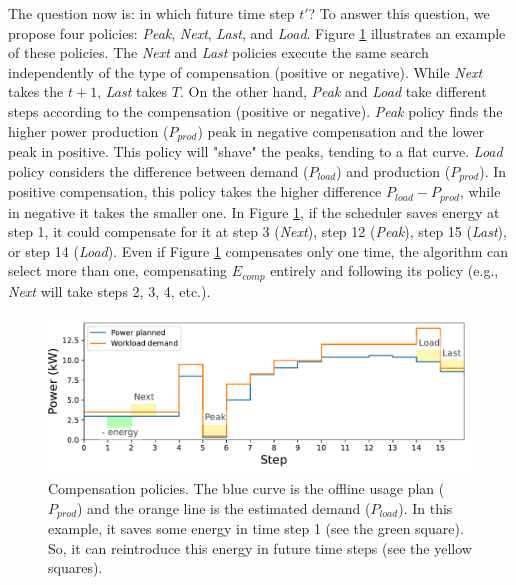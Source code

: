 The question now is: in which future time step $t'$? To answer this question, we propose four policies: \emph{Peak}, \emph{Next}, \emph{Last}, and \emph{Load}. Figure \ref{fig:compensation} illustrates an example of these policies. The \emph{Next} and \emph{Last} policies execute the same search independently of the type of compensation (positive or negative). While \emph{Next} takes the $t + 1$, \emph{Last} takes $T$. On the other hand, \emph{Peak} and \emph{Load} take different steps according to the compensation (positive or negative). \emph{Peak} policy finds the higher power production ($P_{prod}$) peak in negative compensation and the lower peak in positive. This policy will "shave" the peaks, tending to a flat curve. \emph{Load} policy considers the difference between demand ($P_{load}$) and production ($P_{prod}$). In positive compensation, this policy takes the higher difference $P_{load} - P_{prod}$, while in negative it takes the smaller one. In Figure \ref{fig:compensation}, if the scheduler saves energy at step 1, it could compensate for it at step 3 (\emph{Next}), step 12 (\emph{Peak}), step 15 (\emph{Last}), or step 14 (\emph{Load}). Even if Figure \ref{fig:compensation} compensates only one time, the algorithm can select more than one, compensating $E_{comp}$ entirely and following its policy (e.g., \emph{Next} will take steps 2, 3, 4, etc.).

\begin{figure}[!htb]
    \centering
    \includegraphics[scale=0.7]{Images/Compensations/policies.pdf}
    \caption{Compensation policies. The blue curve is the offline usage plan ($P_{prod}$) and the orange line is the estimated demand ($P_{load}$). In this example, it saves some energy in time step 1 (see the green square). So, it can reintroduce this energy in future time steps (see the yellow squares).}
    \label{fig:compensation}
\end{figure}

